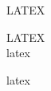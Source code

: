 \documentclass[12pt]{article}
\begin{document}
	LATEX
	
	\noindent LATEX\\
	latex
	\par latex
	
	
\end{document}
